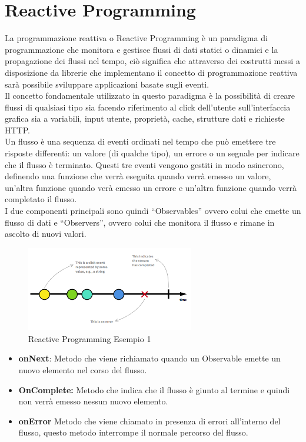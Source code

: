    \section{Reactive Programming}
   La programmazione reattiva o Reactive Programming è un paradigma di programmazione che monitora e gestisce flussi di dati statici o dinamici e la propagazione dei flussi nel tempo, ciò significa che attraverso dei costrutti messi a disposizione da librerie che implementano il concetto di programmazione reattiva sarà possibile sviluppare applicazioni basate sugli eventi.\\
   Il concetto fondamentale utilizzato in questo paradigma è la possibilità di creare flussi di qualsiasi tipo sia facendo riferimento al click dell'utente sull'interfaccia grafica sia a variabili, input utente, proprietà, cache, strutture dati e richieste HTTP.\\
   Un flusso è una sequenza di eventi ordinati nel tempo che può emettere tre risposte differenti: un valore (di qualche tipo), un errore o un segnale per indicare che il flusso è terminato. Questi tre eventi vengono gestiti in modo asincrono, definendo una funzione che verrà eseguita quando verrà emesso un valore, un'altra funzione quando verà emesso un errore e un'altra funzione quando verrà completato il flusso.\\
   I due componenti principali sono quindi ``Observables'' ovvero colui che emette un flusso di dati
   e ``Observers'', ovvero colui che monitora il flusso e rimane in ascolto di nuovi valori.

   \begin{figure}[!hb]
     \centering
     \includegraphics[width=0.65\textwidth]{immagini/reactive_programming_es1.png}
     \caption{Reactive Programming Esempio 1}\label{fig:Reactive Programming Esempio 1}
   \end{figure}

   \newpage
   \begin{itemize}
     \item \textbf{onNext}: Metodo che viene richiamato quando un Observable emette un nuovo elemento nel corso del flusso.
     \item  \textbf{OnComplete:} Metodo che indica che il flusso è giunto al termine e quindi non verrà emesso nessun nuovo elemento.
     \item \textbf{onError} Metodo che viene chiamato in presenza di errori all'interno del flusso, questo metodo interrompe il normale percorso del flusso.
   \end{itemize}

